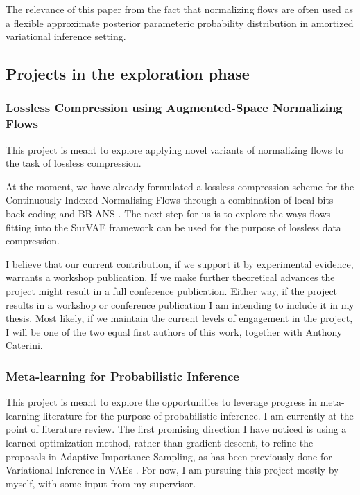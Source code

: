 \documentclass[12pt]{article}
\begin{document}
The relevance of this paper from the fact that normalizing flows are often used as a flexible approximate posterior parameteric probability distribution in amortized variational inference setting.


\subsection{Projects in the exploration phase}

\subsubsection{Lossless Compression using Augmented-Space Normalizing Flows}
This project is meant to explore applying novel variants of normalizing flows to the task of lossless compression.

At the moment, we have already formulated a lossless compression scheme for the Continuously Indexed Normalising Flows \citep{Cornish2020cif} through a combination of local bits-back coding \citep{Ho2019local} and BB-ANS \citep{Townsend2019bbans}.
The next step for us is to explore the ways flows fitting into the SurVAE framework \citep{Nielsen2020survae} can be used for the purpose of lossless data compression.

I believe that our current contribution, if we support it by experimental evidence, warrants a workshop publication.
If we make further theoretical advances the project might result in a full conference publication.
Either way, if the project results in a workshop or conference publication I am intending to include it in my thesis.
Most likely, if we maintain the current levels of engagement in the project, I will be one of the two equal first authors of this work, together with Anthony Caterini.

\subsubsection{Meta-learning for Probabilistic Inference}
This project is meant to explore the opportunities to leverage progress in meta-learning literature for the purpose of probabilistic inference.
I am currently at the point of literature review.
The first promising direction I have noticed is using a learned optimization method, rather than gradient descent, to refine the proposals in Adaptive Importance Sampling, as has been previously done for Variational Inference in VAEs \citep{Marino2018iterative}.
For now, I am pursuing this project mostly by myself, with some input from my supervisor.
\end{document}
